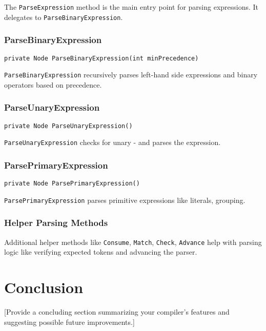 \documentclass{article}
\begin{document}
The \texttt{ParseExpression} method is the main entry point for parsing expressions. It delegates to \texttt{ParseBinaryExpression}.


\subsubsection{ParseBinaryExpression}

\begin{lstlisting}[language={[Sharp]C}]
private Node ParseBinaryExpression(int minPrecedence)
\end{lstlisting}

\texttt{ParseBinaryExpression} recursively parses left-hand side expressions and binary operators based on precedence.


\subsubsection{ParseUnaryExpression}

\begin{lstlisting}[language={[Sharp]C}]
private Node ParseUnaryExpression()
\end{lstlisting}

\texttt{ParseUnaryExpression} checks for unary - and parses the expression.


\subsubsection{ParsePrimaryExpression}

\begin{lstlisting}[language={[Sharp]C}]
private Node ParsePrimaryExpression()
\end{lstlisting}

\texttt{ParsePrimaryExpression} parses primitive expressions like literals, grouping.

\subsubsection{Helper Parsing Methods}
Additional helper methods like \texttt{Consume}, \texttt{Match}, \texttt{Check}, \texttt{Advance} help with parsing logic like verifying expected tokens and advancing the parser.




\section{Conclusion}

[Provide a concluding section summarizing your compiler's features and suggesting possible future improvements.]
\end{document}
